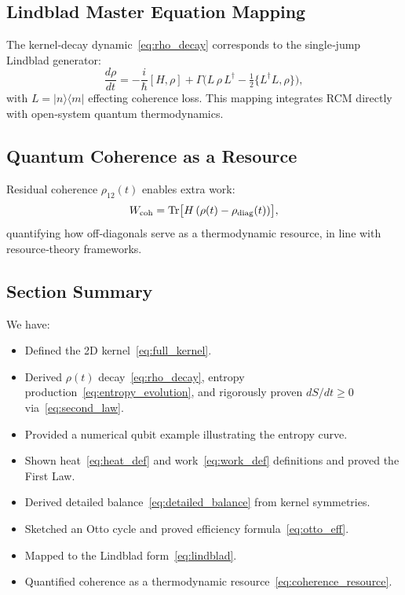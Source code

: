 \subsection{Lindblad Master Equation Mapping}

The kernel‐decay dynamic~\eqref{eq:rho_decay} corresponds to the single‐jump Lindblad generator:
\begin{equation}\label{eq:lindblad}
\frac{d\rho}{dt} = -\frac{i}{\hbar}[H,\rho]
  + \Gamma\bigl(L\,\rho\,L^\dagger - \tfrac12\{L^\dagger L,\rho\}\bigr),
\end{equation}
with $L=|n\rangle\langle m|$ effecting coherence loss.  This mapping integrates RCM directly with open‐system quantum thermodynamics.

\subsection{Quantum Coherence as a Resource}

Residual coherence $\rho_{12}(t)$ enables extra work:
\[
W_{\rm coh}
= \Tr\bigl[H\,( \rho(t) - \rho_{\rm diag}(t) )\bigr],
\]
quantifying how off‐diagonals serve as a thermodynamic resource, in line with resource‐theory frameworks.

\subsection{Section Summary}

We have:
\begin{itemize}
  \item Defined the 2D kernel~\eqref{eq:full_kernel}.
  \item Derived $\rho(t)$ decay~\eqref{eq:rho_decay}, entropy production~\eqref{eq:entropy_evolution}, and rigorously proven $dS/dt\ge0$ via~\eqref{eq:second_law}.
  \item Provided a numerical qubit example illustrating the entropy curve.
  \item Shown heat~\eqref{eq:heat_def} and work~\eqref{eq:work_def} definitions and proved the First Law.
  \item Derived detailed balance~\eqref{eq:detailed_balance} from kernel symmetries.
  \item Sketched an Otto cycle and proved efficiency formula~\eqref{eq:otto_eff}.
  \item Mapped to the Lindblad form~\eqref{eq:lindblad}.
  \item Quantified coherence as a thermodynamic resource~\eqref{eq:coherence_resource}.
\end{itemize}

